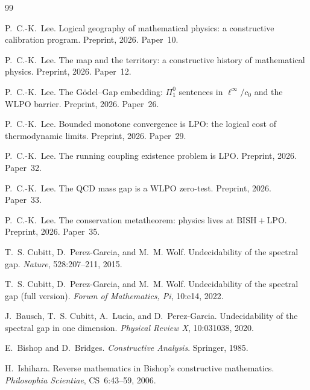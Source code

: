 \documentclass[11pt,a4paper]{article}
\theoremstyle{plain}
\theoremstyle{definition}
\newcommand{\LPO}{\ensuremath{\mathrm{LPO}}}
\newcommand{\WLPO}{\ensuremath{\mathrm{WLPO}}}
\newcommand{\BISH}{\ensuremath{\mathrm{BISH}}}
\begin{document}

\begin{thebibliography}{99}

P.~C.-K.~Lee.
\newblock Logical geography of mathematical physics: a constructive
  calibration program.
\newblock Preprint, 2026. Paper~10.

P.~C.-K.~Lee.
\newblock The map and the territory: a constructive history of
  mathematical physics.
\newblock Preprint, 2026. Paper~12.

P.~C.-K.~Lee.
\newblock The G\"odel--Gap embedding: $\Pi^0_1$ sentences in
  $\ell^\infty / c_0$ and the $\WLPO$ barrier.
\newblock Preprint, 2026. Paper~26.

P.~C.-K.~Lee.
\newblock Bounded monotone convergence is $\LPO$: the logical cost
  of thermodynamic limits.
\newblock Preprint, 2026. Paper~29.

P.~C.-K.~Lee.
\newblock The running coupling existence problem is $\LPO$.
\newblock Preprint, 2026. Paper~32.

P.~C.-K.~Lee.
\newblock The QCD mass gap is a $\WLPO$ zero-test.
\newblock Preprint, 2026. Paper~33.

P.~C.-K.~Lee.
\newblock The conservation metatheorem: physics lives at $\BISH + \LPO$.
\newblock Preprint, 2026. Paper~35.

T.~S. Cubitt, D.~Perez-Garcia, and M.~M. Wolf.
\newblock Undecidability of the spectral gap.
\newblock \emph{Nature}, 528:207--211, 2015.

T.~S. Cubitt, D.~Perez-Garcia, and M.~M. Wolf.
\newblock Undecidability of the spectral gap (full version).
\newblock \emph{Forum of Mathematics, Pi}, 10:e14, 2022.

J.~Bausch, T.~S. Cubitt, A.~Lucia, and D.~Perez-Garcia.
\newblock Undecidability of the spectral gap in one dimension.
\newblock \emph{Physical Review X}, 10:031038, 2020.

E.~Bishop and D.~Bridges.
\newblock \emph{Constructive Analysis}.
\newblock Springer, 1985.

H.~Ishihara.
\newblock Reverse mathematics in Bishop's constructive mathematics.
\newblock \emph{Philosophia Scientiae}, CS~6:43--59, 2006.


\end{thebibliography}
\end{document}
